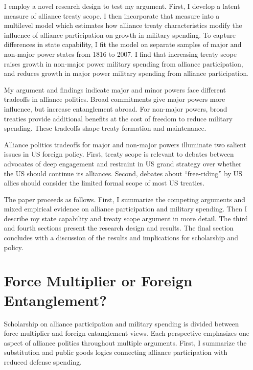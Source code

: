 \documentclass[12pt]{article}
\begin{document}
I employ a novel research design to test my argument.
First, I develop a latent measure of alliance treaty scope. 
I then incorporate that measure into a multilevel model which estimates how alliance treaty characteristics modify the influence of alliance participation on growth in military spending.
To capture differences in state capability, I fit the model on separate samples of major and non-major power states from 1816 to 2007. 
I find that increasing treaty scope raises growth in non-major power military spending from alliance participation, and reduces growth in major power military spending from alliance participation. 


My argument and findings indicate major and minor powers face different tradeoffs in alliance politics.
Broad commitments give major powers more influence, but increase entanglement abroad.
For non-major powers, broad treaties provide additional benefits at the cost of freedom to reduce military spending. 
These tradeoffs shape treaty formation and maintenance. 


Alliance politics tradeoffs for major and non-major powers illuminate two salient issues in US foreign policy. 
First, treaty scope is relevant to debates between advocates of deep engagement \citep{Brooksetal2013} and restraint \citep{Posen2014} in US grand strategy over whether the US should continue its alliances. 
Second, debates about ``free-riding'' by US allies should consider the limited formal scope of most US treaties. 


The paper proceeds as follows. 
First, I summarize the competing arguments and mixed empirical evidence on alliance participation and military spending. 
Then I describe my state capability and treaty scope argument in more detail. 
The third and fourth sections present the research design and results. 
The final section concludes with a discussion of the results and implications for scholarship and policy.  



\section{Force Multiplier or Foreign Entanglement?}


Scholarship on alliance participation and military spending is divided between force multiplier and foreign entanglement views.
Each perspective emphasizes one aspect of alliance politics throughout multiple arguments.  
First, I summarize the substitution and public goods logics connecting alliance participation with reduced defense spending. 
\end{document}
